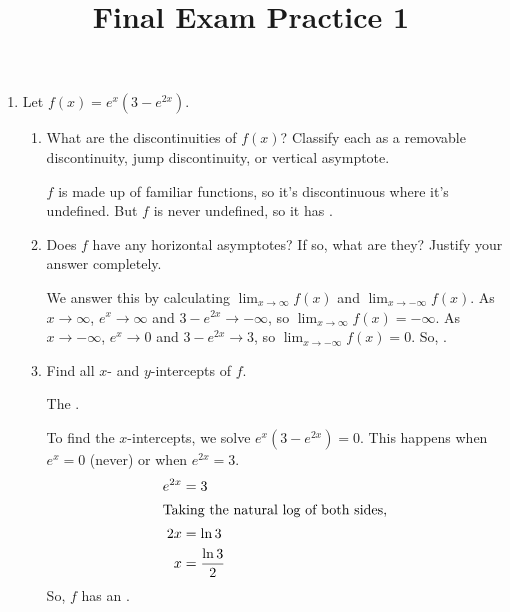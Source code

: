 \documentclass{article}
\providecommand{\topic}{}
\renewcommand{\topic}[1]{}
\theoremstyle{theorem}
\begin{document}
  \title{Final Exam Practice 1}


\listofproblems

\begin{enumerate}
\item {} \label{fall2014-m2practice-exp-graphing} 

  \topic{graphing, exponentials}

  Let $f(x) = e^x (3 - e^{2x})$.  

  \begin{enumerate}
  \item
    \begin{problem}[1in]
      What are the discontinuities of $f(x)$? Classify each as a removable discontinuity, jump discontinuity, or vertical asymptote.
    \end{problem}

    \begin{solution}
      $f$ is made up of familiar functions, so it's discontinuous where it's undefined. But $f$ is never undefined, so it has .
    \end{solution}

  \item
    \begin{problem}[\vfill]
      Does $f$ have any horizontal asymptotes?  If so, what are they? Justify your answer completely. 
    \end{problem}

    \begin{solution}
      We answer this by calculating $\displaystyle \lim_{x \to \infty} f(x)$ and $\displaystyle \lim_{x \to -\infty} f(x)$. As $x \to \infty$, $e^x \to \infty$ and $3 - e^{2x} \to -\infty$, so $\boxed{ \lim_{x \to \infty} f(x) = - \infty}$. As $x \to -\infty$, $e^x \to 0$ and $3 - e^{2x} \to 3$, so $\boxed{ \lim_{x \to -\infty} f(x) = 0}$. So, .
    \end{solution}

  \item
    \begin{problem}[\vfill\newpage]
      Find all $x$- and $y$-intercepts of $f$. 
    \end{problem}

    \begin{solution}
      The .

      To find the $x$-intercepts, we solve $e^x (3 - e^{2x}) = 0$. This happens when $e^x = 0$ (never) or when $e^{2x} = 3$.
      \begin{align*}
        e^{2x} &= 3 \\
        \intertext{Taking the natural log of both sides,}
        2x &= \ln 3 \\
        x &= \frac{\ln 3}{2}
      \end{align*}
      So, $f$ has an .
    \end{solution}


\end{enumerate}
\end{enumerate}
\end{document}

